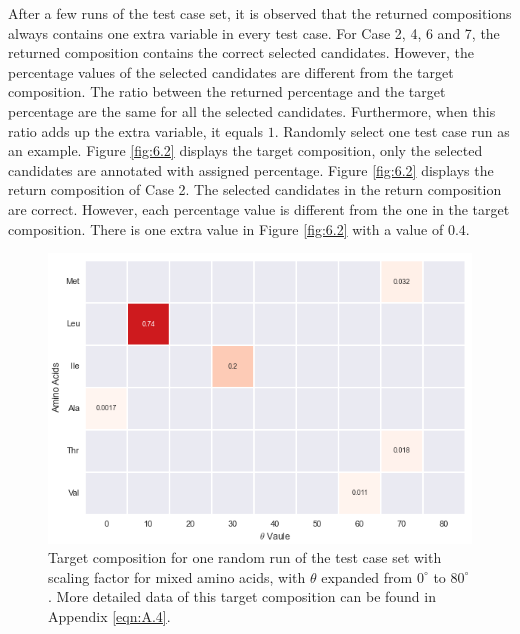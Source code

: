 After a few runs of the test case set, it is observed that the returned compositions always contains one extra variable in every test case. For Case 2, 4, 6 and 7, the returned composition contains the correct selected candidates. However, the percentage values of the selected candidates are different from the target composition. The ratio between the returned percentage and the target percentage are the same for all the selected candidates. Furthermore, when this ratio adds up the extra variable, it equals $1$. Randomly select one test case run as an example. Figure \ref{fig:6.2} displays the target composition, only the selected candidates are annotated with assigned percentage. Figure \ref{fig:6.2} displays the return composition of Case 2. The selected candidates in the return composition are correct. However, each percentage value is different from the one in the target composition. There is one extra value in Figure \ref{fig:6.2} with a value of $0.4$. \\

\begin{figure}[!ht] 
\centering
\includegraphics[scale=0.9]{Figures/chapter6_figure_one.png}
\caption{Target composition for one random run of the test case set with scaling factor for mixed amino acids, with $\theta$ expanded from $0^{\circ}$ to $80^{\circ}$. More detailed data of this target composition can be found in Appendix \ref{eqn:A.4}.} \label{fig:6.1}
\end{figure}

